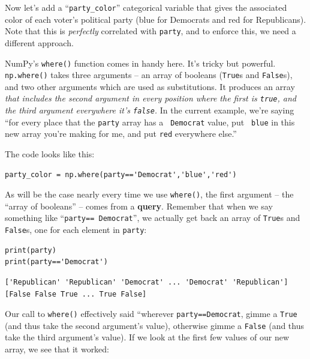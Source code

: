 Now let's add a ``\texttt{party\_color}'' categorical variable that gives the
associated color of each voter's political party (blue for Democrats and red
for Republicans). Note that this is \textit{perfectly} correlated with
\texttt{party}, and to enforce this, we need a different approach.


NumPy's \texttt{where()} function comes in handy here. It's tricky but
powerful. \texttt{np.where()} takes three arguments -- an array of booleans
(\texttt{True}s and \texttt{False}s), and two other arguments which are used as
substitutions. It produces an array \textit{that includes the second argument
in every position where the first is \texttt{true}, and the third argument
everywhere it's \texttt{false}.} In the current example, we're saying ``for
every place that the \texttt{party} array has a \texttt{\textquotesingle
Democrat\textquotesingle } value, put \texttt{\textquotesingle
blue\textquotesingle } in this new array you're making for me, and put
\texttt{\textquotesingle red\textquotesingle } everywhere else.''

The code looks like this:

\begin{Verbatim}[fontsize=\small,samepage=true,frame=single,framesep=3mm]
party_color = np.where(party=='Democrat','blue','red')
\end{Verbatim}

As will be the case nearly every time we use \texttt{where()}, the first
argument -- the ``array of booleans'' -- comes from a \textbf{query}. Remember
that when we say something like ``\texttt{party==\textquotesingle
Democrat\textquotesingle}'', we actually get back an array of \texttt{True}s
and \texttt{False}s, one for each element in \texttt{party}:

\begin{Verbatim}[fontsize=\small,samepage=true,frame=single,framesep=3mm]
print(party)
print(party=='Democrat')
\end{Verbatim}
\vspace{-.2in}

\begin{Verbatim}[fontsize=\footnotesize,samepage=true,frame=leftline,framesep=5mm,framerule=1mm]
['Republican' 'Republican' 'Democrat' ... 'Democrat' 'Republican']
[False False True ... True False]
\end{Verbatim}


Our call to \texttt{where()} effectively said ``wherever
\texttt{party==\textquotesingle Democrat\textquotesingle}, gimme a
\texttt{True} (and thus take the second argument's value), otherwise gimme a
\texttt{False} (and thus take the third argument's value). If we look at the
first few values of our new array, we see that it worked:

